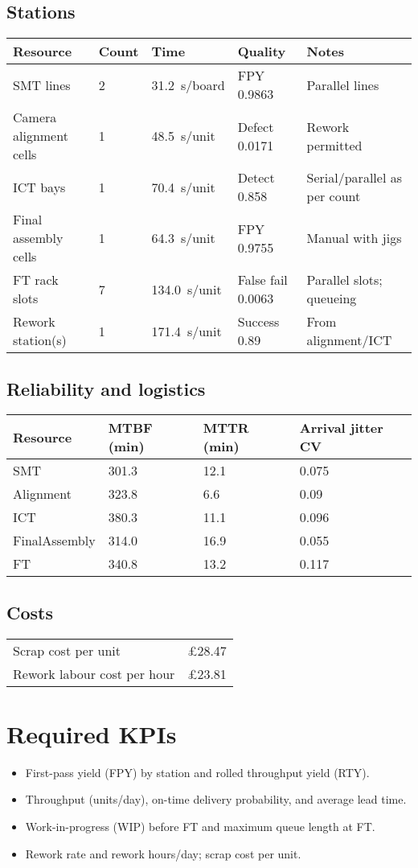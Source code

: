 \documentclass[11pt,a4paper]{article}
\begin{document}
\subsection*{Stations}
\begin{longtable}{@{}lllll@{}}
\toprule
\textbf{Resource} & \textbf{Count} & \textbf{Time} & \textbf{Quality} & \textbf{Notes} \\
\midrule
SMT lines & 2 & 31.2~s/board & FPY 0.9863 & Parallel lines \\
Camera alignment cells & 1 & 48.5~s/unit & Defect 0.0171 & Rework permitted \\
ICT bays & 1 & 70.4~s/unit & Detect 0.858 & Serial/parallel as per count \\
Final assembly cells & 1 & 64.3~s/unit & FPY 0.9755 & Manual with jigs \\
FT rack slots & 7 & 134.0~s/unit & False fail 0.0063 & Parallel slots; queueing \\
Rework station(s) & 1 & 171.4~s/unit & Success 0.89 & From alignment/ICT \\
\bottomrule
\end{longtable}

\subsection*{Reliability and logistics}
\begin{tabular}{@{}llll@{}}
\toprule Resource & MTBF (min) & MTTR (min) & Arrival jitter CV \\
\midrule
SMT & 301.3 & 12.1 & 0.075 \\
Alignment & 323.8 & 6.6 & 0.09 \\
ICT & 380.3 & 11.1 & 0.096 \\
FinalAssembly & 314.0 & 16.9 & 0.055 \\
FT & 340.8 & 13.2 & 0.117 \\
\bottomrule
\end{tabular}

\subsection*{Costs}
\begin{tabular}{@{}ll@{}}
\toprule
Scrap cost per unit & \pounds 28.47 \\
Rework labour cost per hour & \pounds 23.81 \\
\bottomrule
\end{tabular}

\section*{Required KPIs}
\begin{itemize}
\item First-pass yield (FPY) by station and rolled throughput yield (RTY).
\item Throughput (units/day), on-time delivery probability, and average lead time.
\item Work-in-progress (WIP) before FT and maximum queue length at FT.
\item Rework rate and rework hours/day; scrap cost per unit.
\end{itemize}
\end{document}
